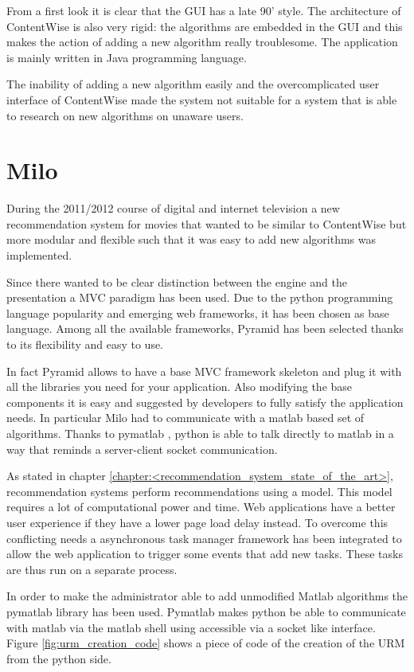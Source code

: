 From a first look it is clear that the \ac{GUI} has a late 90' style. The architecture of ContentWise is also very rigid: the algorithms are embedded in the \ac{GUI} and this makes the action of adding a new algorithm really troublesome.
The application is mainly written in Java programming language.

The inability of adding a new algorithm easily and the overcomplicated user interface of ContentWise made the system not suitable for a system that is able to research on new algorithms on unaware users.

\section{Milo}
\label{sec:milo}

During the 2011/2012 course of digital and internet television a new recommendation system for movies that wanted to be similar to ContentWise but more modular and flexible such that it was easy to add new algorithms was implemented.

Since there wanted to be clear distinction between the engine and the presentation a \ac{MVC} \cite{mvc} paradigm has been used. Due to the python programming language popularity and emerging web frameworks, it has been chosen as base language. Among all the available frameworks, Pyramid \cite{pyramid} has been selected thanks to its flexibility and easy to use.

In fact Pyramid allows to have a base \ac{MVC} framework skeleton and plug it with all the libraries you need for your application. Also modifying the base components it is easy and suggested by developers to fully satisfy the application needs. In particular Milo had to communicate with a matlab \cite{matlab} based set of algorithms. Thanks to pymatlab \cite{pymatlab}, python is able to talk directly to matlab in a way that reminds a server-client socket communication.

As stated in chapter \ref{chapter:<recommendation_system_state_of_the_art>}, recommendation systems perform recommendations using a model. This model requires a lot of computational power and time. Web applications have a better user experience if they have a lower page load delay instead. To overcome this conflicting needs a asynchronous task manager framework has been integrated to allow the web application to trigger some events that add new tasks. These tasks are thus run on a separate process.

In order to make the administrator able to add unmodified Matlab \cite{matlab} algorithms the pymatlab \cite{pymatlab} library has been used. Pymatlab makes python be able to communicate with matlab via the matlab shell using accessible via a socket like interface. Figure \ref{fig:urm_creation_code} shows a piece of code of the creation of the \ac{URM} from the python side.

